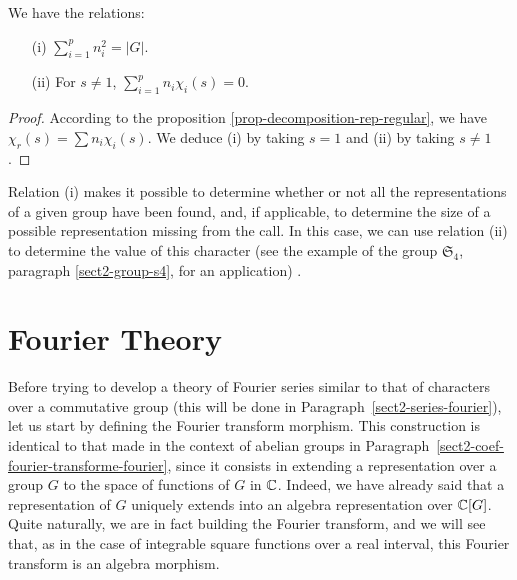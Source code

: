  
\begin{cor}
\label{cor-enombrement}
We have the relations: \begin{itemize}
\item [{\upshape (i)}] $ \sum_{i = 1}^p{n_i^2} = |G| $.
\item [{\upshape (ii)}] For $ s \neq 1 $, $ \sum_{i = 1}^p{n_i \chi_i (s)} = 0 $.
\end{itemize}
\end{cor}
\begin{proof}
According to the proposition \ref{prop-decomposition-rep-regular}, we have $ \chi_r (s) = \sum{n_i \chi_i (s)} $. We deduce (i) by taking $ s = 1 $ and (ii) by taking $ s \neq 1 $.
\end{proof}
 
 
\begin{rem}
Relation (i) makes it possible to determine whether or not all the representations of a given group have been found, and, if applicable, to determine the size of a possible representation missing from the call. In this case, we can use relation (ii) to determine the value of this character (see the example of the group $ \mathfrak{S}_4 $, paragraph \ref{sect2-group-s4}, for an application) .
\end{rem}
 
\section{Fourier Theory}
 
Before trying to develop a theory of Fourier series similar to that of characters over a commutative group (this will be done in Paragraph~\ref{sect2-series-fourier}), let us start by defining the Fourier transform morphism. This construction is identical to that made in the context of abelian groups in Paragraph~\ref{sect2-coef-fourier-transforme-fourier}, since it consists in extending a representation over a group $G$ to the space of functions of $G$ in $ \mathbb{C} $. Indeed, we have already said that a representation of $G$ uniquely extends into an algebra representation over $ \mathbb{C} [G] $. Quite naturally, we are in fact building the Fourier transform, and we will see that, as in the case of integrable square functions over a real interval, this Fourier transform is an algebra morphism.
